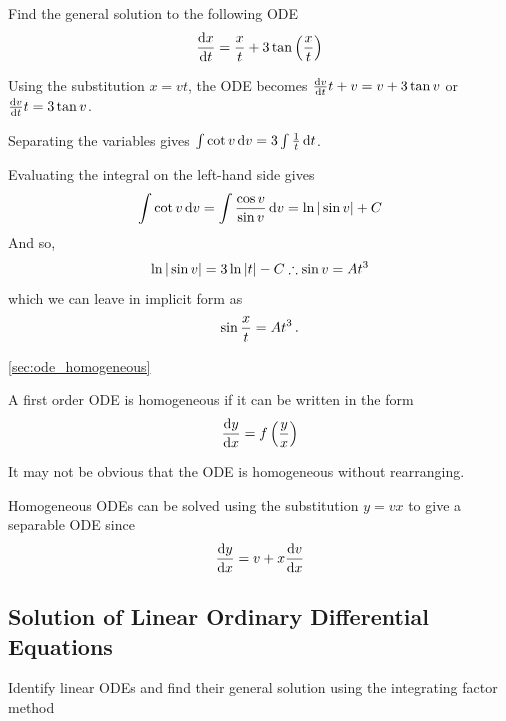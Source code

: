 
\goodbreak
\begin{example}[Video]
\label{ex:642}

Find the general solution to the following ODE
\[
\frac{{\rm d} x}{{\rm d} t}=\frac{x}{t}+3\tan \left(\frac{x}{t}\right)
\]

\end{example}
\begin{solution}

Using the substitution $x=vt$, the ODE becomes $\frac{{\rm d} v}{{\rm d} t}t+v=v+3\tan v$ or $\frac{{\rm d} v}{{\rm d} t}t=3\tan v$.

Separating the variables gives $\int \cot v\, {\rm d}v=3\int \frac{1}{t}\, {\rm d}t$.

Evaluating the integral on the left-hand side gives
\[
\int \cot v \, {\rm d}v=\int \frac{\cos v}{\sin v}\, {\rm d}v=\ln |\sin v|+C
\]
And so,
\[
\ln |\sin v|=3\ln \left|t\right|-C \therefore \sin v=A{t}^{3}
\]
which we can leave in implicit form as
\[
\sin \frac{x}{t}=A{t}^{3} \, .
\]
\end{solution}


\begin{recap}{\ref{sec:ode_homogeneous}}

\item A first order ODE is homogeneous if it can be written in the form
\[
\frac{{\rm d} y}{{\rm d} x}=f\left(\frac{y}{x}\right)
\]

\item It may not be obvious that the ODE is homogeneous without rearranging.

\item Homogeneous ODEs can be solved using the substitution $y=vx$ to give a separable ODE since
\[
\frac{{\rm d} y}{{\rm d} x}=v+x\frac{{\rm d} v}{{\rm d} x}
\]

\end{recap}

\newtexpage
\subsection{Solution of Linear Ordinary Differential Equations}
\label{sec:ode_linear}

\begin{learningoutcomes}
\item Identify linear ODEs and find their general solution using the integrating factor method
\end{learningoutcomes}

